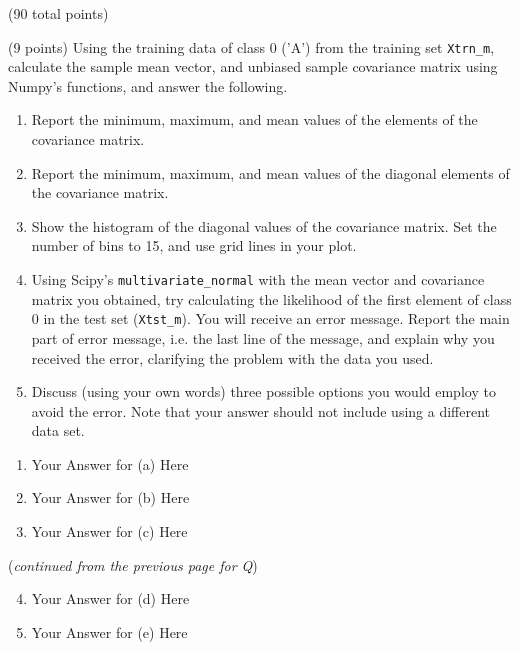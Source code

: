\documentclass[12pt]{article}
\begin{document}
\begin{question}{(90 total points) \qTwoTitle}
\begin{subquestion}{(9 points)
    Using the training data of class 0 ('A') from the training set {\tt Xtrn\_m}, calculate the sample mean vector, and unbiased sample covariance matrix using Numpy's functions, and answer the following.
  } \label{q2:gaussian-1}
  \begin{enumerate}\NARROWITEM
  \item Report the minimum, maximum, and mean values of the elements of the covariance matrix.
  \item Report the minimum, maximum, and mean values of the diagonal elements of the covariance matrix.
  \item Show the histogram of the diagonal values of the covariance matrix. Set the number of bins to 15, and use grid lines in your plot.
  \item Using Scipy's {\tt multivariate\_normal} with the mean vector and covariance matrix you obtained, try calculating the likelihood of the first element of class 0 in the test set ({\tt Xtst\_m}). You will receive an error message. Report the main part of error message, i.e. the last line of the message, and explain why you received the error, clarifying the problem with the data you used.
  \item Discuss (using your own words) three possible options you would employ to avoid the error. Note that your answer should not include using a different data set. 
  \end{enumerate}
   

  \begin{answerbox}{0.65\textheight}
    \begin{enumerate}
    \item Your Answer for (a) Here
    \item Your Answer for (b) Here
    \item Your Answer for (c) Here
    \end{enumerate}
  \end{answerbox}
  \clearpage
  ({\it continued from the previous page for Q\label{q2:gaussian-1}})
  \begin{answerbox}{0.5\textheight}
    \begin{enumerate}\setcounter{enumi}{3}
    \item Your Answer for (d) Here
    \item Your Answer for (e) Here
    \end{enumerate}
  \end{answerbox}


\end{subquestion}
\end{question}
\end{document}
